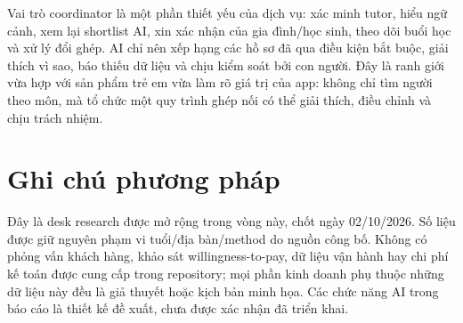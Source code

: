 \documentclass[11pt,a4paper]{article}
\begin{document}
Vai trò coordinator là một phần thiết yếu của dịch vụ: xác minh tutor, hiểu
ngữ cảnh, xem lại shortlist AI, xin xác nhận của gia đình/học sinh, theo dõi
buổi học và xử lý đổi ghép. AI chỉ nên xếp hạng các hồ sơ đã qua điều kiện bắt
buộc, giải thích vì sao, báo thiếu dữ liệu và chịu kiểm soát bởi con người.
Đây là ranh giới vừa hợp với sản phẩm trẻ em vừa làm rõ giá trị của app: không
chỉ tìm người theo môn, mà tổ chức một quy trình ghép nối có thể giải thích,
điều chỉnh và chịu trách nhiệm.

\section*{Ghi chú phương pháp}

Đây là desk research được mở rộng trong vòng này, chốt ngày 02/10/2026. Số liệu được giữ nguyên
phạm vi tuổi/địa bàn/method do nguồn công bố. Không có phỏng vấn khách hàng,
khảo sát willingness-to-pay, dữ liệu vận hành hay chi phí kế toán được cung
cấp trong repository; mọi phần kinh doanh phụ thuộc những dữ liệu này đều là
giả thuyết hoặc kịch bản minh họa. Các chức năng AI trong báo cáo là thiết kế
đề xuất, chưa được xác nhận đã triển khai.
\end{document}
